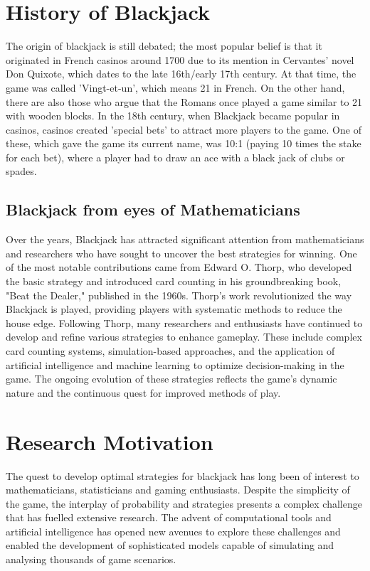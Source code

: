 \documentclass[a4paper,12pt]{report}
\begin{document}
\section{History of Blackjack} The origin of blackjack is still debated; the most popular belief is that it originated in French casinos around 1700 due to its mention in Cervantes' novel Don Quixote, which dates to the late 16th/early 17th century. At that time, the game was called 'Vingt-et-un', which means 21 in French. On the other hand, there are also those who argue that the Romans once played a game similar to 21 with wooden blocks. In the 18th century, when Blackjack became popular in casinos, casinos created 'special bets' to attract more players to the game. One of these, which gave the game its current name, was 10:1 (paying 10 times the stake for each bet), where a player had to draw an ace with a black jack of clubs or spades.


\subsection{Blackjack from eyes of Mathematicians} Over the years, Blackjack has attracted significant attention from mathematicians and researchers who have sought to uncover the best strategies for winning. One of the most notable contributions came from Edward O. Thorp, who developed the basic strategy\cite{paper:1} and introduced card counting in his groundbreaking book, "Beat the Dealer," published in the 1960s. Thorp's work revolutionized the way Blackjack is played, providing players with systematic methods to reduce the house edge. Following Thorp, many researchers and enthusiasts have continued to develop and refine various strategies to enhance gameplay. These include complex card counting systems, simulation-based approaches, and the application of artificial intelligence and machine learning to optimize decision-making in the game. The ongoing evolution of these strategies reflects the game's dynamic nature and the continuous quest for improved methods of play.\cite{paper:5}

\section{Research Motivation} The quest to develop optimal strategies for blackjack has long been of interest to mathematicians, statisticians and gaming enthusiasts. Despite the simplicity of the game, the interplay of probability and strategies presents a complex challenge that has fuelled extensive research. The advent of computational tools and artificial intelligence has opened new avenues to explore these challenges and enabled the development of sophisticated models capable of simulating and analysing thousands of game scenarios.
\end{document}
